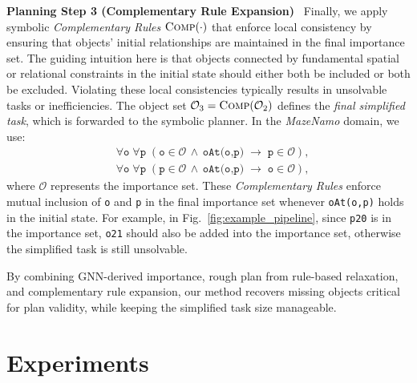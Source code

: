 \documentclass[letterpaper, 10pt, journal, twoside]{IEEEtran}
\newcommand{\fref}[1]{Fig.~\ref{#1}}
\newcommand{\myparagraph}[1]{\noindent\textbf{#1}~}
\begin{document}
\myparagraph{Planning Step 3 (Complementary Rule Expansion)}
\label{sec:step3}
Finally, we apply symbolic \emph{Complementary Rules} \(\textsc{Comp}(\cdot)\) that enforce local consistency by ensuring that objects' initial relationships are maintained in the final importance set. The guiding intuition here is that objects connected by fundamental spatial or relational constraints in the initial state should either both be included or both be excluded. Violating these local consistencies typically results in unsolvable tasks or inefficiencies. The object set \(\mathcal O_3=\textsc{Comp}(\mathcal O_2)\) defines the \emph{final simplified task}, which is forwarded to the symbolic planner. 
In the \emph{MazeNamo} domain, we use:
\begin{align*}
&\forall \texttt{o}\;\forall \texttt{p}\;(\texttt{o}\in \mathcal{O} \,\land\,\texttt{oAt(o,p)}\;\rightarrow\;\texttt{p}\in \mathcal{O}),\\
&\forall \texttt{o}\;\forall \texttt{p}\;(\texttt{p}\in \mathcal{O} \,\land\,\texttt{oAt(o,p)}\;\rightarrow\;\texttt{o}\in \mathcal{O}),
\end{align*}
where $\mathcal{O}$ represents the importance set. These \emph{Complementary Rules} enforce mutual inclusion of \texttt{o} and \texttt{p} in the final importance set whenever \texttt{oAt(o,p)} holds in the initial state. For example, in \fref{fig:example_pipeline}, since \texttt{p20} is in the importance set, \texttt{o21} should also be added into the importance set, otherwise the simplified task 
is still unsolvable.

By combining GNN-derived importance, rough plan from rule-based relaxation, and complementary rule expansion, our method recovers missing objects critical for plan validity, while keeping the simplified task size manageable.


\section{Experiments}
\end{document}
